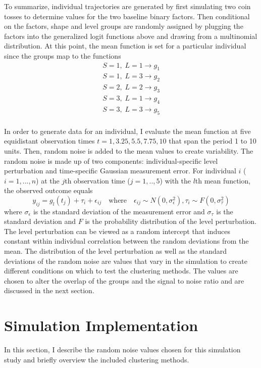 To summarize, individual trajectories are generated by first simulating two coin tosses to determine values for the two baseline binary factors. Then conditional on the factors, shape and level groups are randomly assigned by plugging the factors into the generalized logit functions above and drawing from a multinomial distribution. At this point, the mean function is set for a particular individual since the groups map to the functions
\begin{align*}
S = 1,\; L=1 \rightarrow g_{1}\\
S = 1,\; L=3 \rightarrow g_{2}\\
S = 2,\; L=2 \rightarrow g_{3}\\
S = 3,\; L=1 \rightarrow g_{4}\\
S = 3,\; L=3 \rightarrow g_{5}\\
\end{align*}

In order to generate data for an individual, I evaluate the mean function at five equidistant observation times $t=1,3.25,5.5,7.75,10$ that span the period 1 to 10 units. Then,  random noise is added to the mean values to create variability. The random noise is made up of two components: individual-specific level perturbation and time-specific Gaussian measurement error. For individual $i$ ($i=1,...,n$) at the $j$th observation time ($j=1,..,5$) with the $l$th mean function, the observed outcome equals
$$y_{ij} = g_{l}(t_{j})+\tau_{i}+\epsilon_{ij}\quad\text{where}\quad \epsilon_{ij}\sim N(0,\sigma_{\epsilon}^{2}), \tau_{i}\sim F(0,\sigma_{\tau}^{2})$$
where $\sigma_{\epsilon}$  is the standard deviation of the measurement error and $\sigma_{\tau}$ is the standard deviation and $F$ is the probability distribution of the level perturbation.\\
 
The level perturbation can be viewed as a random intercept that induces constant within individual correlation between the random deviations from the mean. The distribution of the level perturbation as well as the standard deviations of the random noise are values that vary in the simulation to create different conditions on which to test the clustering methods. The values are chosen to alter the overlap of the groups and the signal to noise ratio and are discussed in the next section.
\section{Simulation Implementation}
In this section, I describe the random noise values chosen for this simulation study and briefly overview the included clustering methods. 

